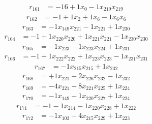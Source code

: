 \[\begin{aligned}
r_{161} &= - 16 + 1 x_{0} - 1 x_{219} x_{219}
\end{aligned}\]
\[\begin{aligned}
r_{162} &= - 1 + 1 x_{2} + 1 x_{6} - 1 x_{6} x_{6}
\end{aligned}\]
\[\begin{aligned}
r_{163} &= - 1 x_{149} x_{221} - 1 x_{221} + 1 x_{230}
\end{aligned}\]
\[\begin{aligned}
r_{164} &= - 1 + 1 x_{220} x_{220} + 1 x_{221} x_{221} - 1 x_{230} x_{230}
\end{aligned}\]
\[\begin{aligned}
r_{165} &= - 1 x_{223} - 1 x_{223} x_{224} + 1 x_{231}
\end{aligned}\]
\[\begin{aligned}
r_{166} &= - 1 + 1 x_{222} x_{222} + 1 x_{223} x_{223} - 1 x_{231} x_{231}
\end{aligned}\]
\[\begin{aligned}
r_{167} &= - 1 x_{215} x_{215} + 1 x_{232}
\end{aligned}\]
\[\begin{aligned}
r_{168} &= + 1 x_{221} - 2 x_{226} x_{232} - 1 x_{232}
\end{aligned}\]
\[\begin{aligned}
r_{169} &= - 4 x_{221} - 8 x_{221} x_{225} + 1 x_{224}
\end{aligned}\]
\[\begin{aligned}
r_{170} &= - 1 x_{149} - 1 x_{220} x_{227} + 1 x_{224}
\end{aligned}\]
\[\begin{aligned}
r_{171} &= - 1 - 1 x_{214} - 1 x_{220} x_{228} + 1 x_{222}
\end{aligned}\]
\[\begin{aligned}
r_{172} &= - 1 x_{103} - 4 x_{215} x_{229} + 1 x_{223}
\end{aligned}\]
